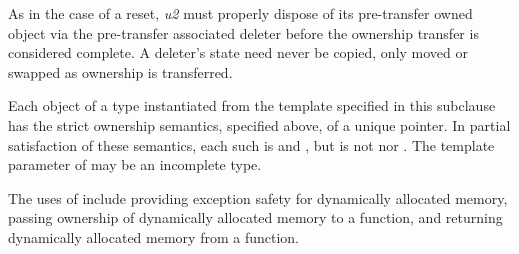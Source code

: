 As in the case of a reset, \textit{u2} must properly dispose of its pre-transfer
owned object via the pre-transfer associated deleter before the ownership
transfer is considered complete. \enternote A deleter's state need never be
copied, only moved or swapped as ownership is transferred. \exitnote

\pnum
Each object of a type  instantiated from the  template
specified in this subclause has the strict ownership semantics, specified above,
of a unique pointer. In partial satisfaction of these semantics, each such 
is  and , but is not
 nor .
The template parameter  of  may be an incomplete type.

\pnum
\enternote The uses
of  include providing exception safety for
dynamically allocated memory, passing ownership of dynamically allocated
memory to a function, and returning dynamically allocated memory from a
function. \exitnote

